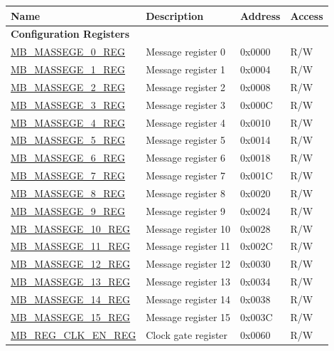 \begin{longtable}{ | p{6cm} | p{7.2cm} | p{1.3cm} | p{1cm} | }
\hline\rowcolor{lightgray}
Name & Description &  Address & Access \\ \hline
\endhead
\multicolumn{4}{|l|}{\textbf{Configuration Registers}} \\ \hline
\hyperref[regdesc:MBMESSAGE0REG]{MB\_MASSEGE\_0\_REG} & Message register 0 & 0x0000 & R/W \\ \hline
\hyperref[regdesc:MBMESSAGE1REG]{MB\_MASSEGE\_1\_REG} & Message register 1 & 0x0004 & R/W \\ \hline
\hyperref[regdesc:MBMESSAGE2REG]{MB\_MASSEGE\_2\_REG} & Message register 2 & 0x0008 & R/W \\ \hline
\hyperref[regdesc:MBMESSAGE3REG]{MB\_MASSEGE\_3\_REG} & Message register 3& 0x000C & R/W \\ \hline
\hyperref[regdesc:MBMESSAGE4REG]{MB\_MASSEGE\_4\_REG} & Message register 4& 0x0010 & R/W \\ \hline
\hyperref[regdesc:MBMESSAGE5REG]{MB\_MASSEGE\_5\_REG} & Message register 5& 0x0014 & R/W \\ \hline
\hyperref[regdesc:MBMESSAGE6REG]{MB\_MASSEGE\_6\_REG} & Message register 6& 0x0018 & R/W \\ \hline
\hyperref[regdesc:MBMESSAGE7REG]{MB\_MASSEGE\_7\_REG} & Message register 7& 0x001C & R/W \\ \hline
\hyperref[regdesc:MBMESSAGE8REG]{MB\_MASSEGE\_8\_REG} & Message register 8& 0x0020 & R/W \\ \hline
\hyperref[regdesc:MBMESSAGE9REG]{MB\_MASSEGE\_9\_REG} & Message register 9& 0x0024 & R/W \\ \hline
\hyperref[regdesc:MBMESSAGE10REG]{MB\_MASSEGE\_10\_REG} & Message register 10& 0x0028 & R/W \\ \hline
\hyperref[regdesc:MBMESSAGE11REG]{MB\_MASSEGE\_11\_REG} & Message register 11& 0x002C & R/W \\ \hline
\hyperref[regdesc:MBMESSAGE12REG]{MB\_MASSEGE\_12\_REG} & Message register 12& 0x0030 & R/W \\ \hline
\hyperref[regdesc:MBMESSAGE13REG]{MB\_MASSEGE\_13\_REG} & Message register 13& 0x0034 & R/W \\ \hline
\hyperref[regdesc:MBMESSAGE14REG]{MB\_MASSEGE\_14\_REG} & Message register 14& 0x0038 & R/W \\ \hline
\hyperref[regdesc:MBMESSAGE15REG]{MB\_MASSEGE\_15\_REG} & Message register 15& 0x003C & R/W \\ \hline
\hyperref[regdesc:MBREGCLKENREG]{MB\_REG\_CLK\_EN\_REG} & Clock gate register & 0x0060 & R/W \\ \hline

\end{longtable}
